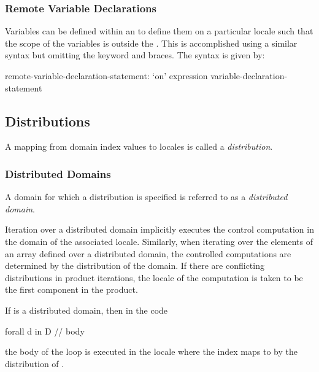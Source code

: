 \subsubsection{Remote Variable Declarations}
\label{remote_variable_declarations}

Variables can be defined within an  to define them
on a particular locale such that the scope of the variables is outside
the .  This is accomplished using a similar syntax
but omitting the  keyword and braces.  The syntax is given
by:
\begin{syntax}
remote-variable-declaration-statement:
  `on' expression variable-declaration-statement
\end{syntax}

\subsection{Distributions}
\label{Distributions}

A mapping from domain index values to locales is called a {\em
distribution}.

\subsubsection{Distributed Domains}
\label{Distributed_Domains}

A domain for which a distribution is specified is referred to as a
{\em distributed domain}.

Iteration over a distributed domain implicitly executes the control
computation in the domain of the associated locale.  Similarly, when
iterating over the elements of an array defined over a distributed
domain, the controlled computations are determined by the distribution
of the domain.  If there are conflicting distributions in product
iterations, the locale of the computation is taken to be the first
component in the product.

\begin{example}
If  is a distributed domain, then in the code
\begin{chapel}
forall d in D {
  // body
}
\end{chapel}
the body of the loop is executed in the locale where the
index  maps to by the distribution of .
\end{example}

